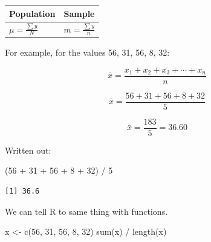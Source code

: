 \documentclass[
  letterpaper,
  DIV=11,
  numbers=noendperiod]{scrartcl}
\newenvironment{Shaded}{\begin{snugshade}}{\end{snugshade}}
\newcommand{\DecValTok}[1]{\textcolor[rgb]{0.68,0.00,0.00}{#1}}
\newcommand{\FunctionTok}[1]{\textcolor[rgb]{0.28,0.35,0.67}{#1}}
\newcommand{\NormalTok}[1]{\textcolor[rgb]{0.00,0.23,0.31}{#1}}
\newcommand{\OtherTok}[1]{\textcolor[rgb]{0.00,0.23,0.31}{#1}}
\newcommand{\SpecialCharTok}[1]{\textcolor[rgb]{0.37,0.37,0.37}{#1}}
\begin{document}
\begin{longtable}[]{@{}
  >{\raggedright\arraybackslash}p{}
  >{\raggedright\arraybackslash}p{}@{}}
\toprule\noalign{}
\begin{minipage}[b]{\linewidth}\raggedright
Population
\end{minipage} & \begin{minipage}[b]{\linewidth}\raggedright
Sample
\end{minipage} \\
\midrule\noalign{}
\endhead
\bottomrule\noalign{}
\endlastfoot
\(                     
 \mu = \frac{\sum y}{N}  
 \) & \(                   
                          m = \frac{\sum y}{n}  
                          \) \\
\end{longtable}

For example, for the values 56, 31, 56, 8, 32:

\[\bar{x} = \frac{x_1 + x_2 + x_3 + \cdots + x_n}{n}\]

\[\bar{x} = \frac{56 + 31 + 56 + 8 + 32}{5}\]

\[\bar{x} = \frac{183}{5} = 36.60\]

Written out:

\begin{Shaded}
\begin{Highlighting}[]
\NormalTok{(}\DecValTok{56} \SpecialCharTok{+} \DecValTok{31} \SpecialCharTok{+} \DecValTok{56} \SpecialCharTok{+} \DecValTok{8} \SpecialCharTok{+} \DecValTok{32}\NormalTok{) }\SpecialCharTok{/} \DecValTok{5}
\end{Highlighting}
\end{Shaded}

\begin{verbatim}
[1] 36.6
\end{verbatim}

We can tell R to same thing with functions.

\begin{Shaded}
\begin{Highlighting}[]
\NormalTok{x }\OtherTok{\textless{}{-}} \FunctionTok{c}\NormalTok{(}\DecValTok{56}\NormalTok{, }\DecValTok{31}\NormalTok{, }\DecValTok{56}\NormalTok{, }\DecValTok{8}\NormalTok{, }\DecValTok{32}\NormalTok{)}
\FunctionTok{sum}\NormalTok{(x) }\SpecialCharTok{/} \FunctionTok{length}\NormalTok{(x)}
\end{Highlighting}
\end{Shaded}
\end{document}

